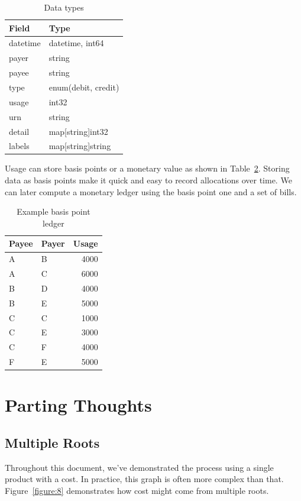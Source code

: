 \documentclass[10pt, a4paper, twocolumn]{article}
\begin{document}
    \begin{table}[H]
      \centering
      \begin{tabular}{ l|l }
        Field & Type \\
        \hline
        datetime & datetime, int64 \\
        payer & string \\
        payee & string \\
        type & enum(debit, credit) \\
        usage & int32 \\
        urn & string \\
        detail & map[string]int32 \\
        labels & map[string]string \\
      \end{tabular}
      \caption{Data types}
      \label{table:4}
    \end{table}

    Usage can store basis points or a monetary value as shown in Table~\ref{table:5}.
    Storing data as basis points make it quick and easy to record allocations over time.
    We can later compute a monetary ledger using the basis point one and a set of bills.

    \begin{table}[H]
      \centering
      \begin{tabular}{ l|l|r }
        Payee & Payer & Usage \\
        \hline
        A & B & 4000 \\
        A & C & 6000 \\
        B & D & 4000 \\
        B & E & 5000 \\
        C & C & 1000 \\
        C & E & 3000 \\
        C & F & 4000 \\
        F & E & 5000 \\
      \end{tabular}
      \caption{Example basis point ledger}
      \label{table:5}
    \end{table}


\section*{Parting Thoughts}

  \subsection*{Multiple Roots}
    Throughout this document, we've demonstrated the process using a single product with a cost.
    In practice, this graph is often more complex than that.
    Figure~\ref{figure:8} demonstrates how cost might come from multiple roots.
\end{document}
